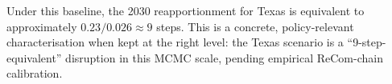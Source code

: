 Under this baseline, the 2030 reapportionment for Texas is equivalent to
approximately $0.23 / 0.026 \approx 9$ \recom{} steps.
This is a concrete, policy-relevant characterisation when kept at the right
level: the Texas scenario is a ``9-step-equivalent'' disruption in this MCMC
scale, pending empirical ReCom-chain calibration.
